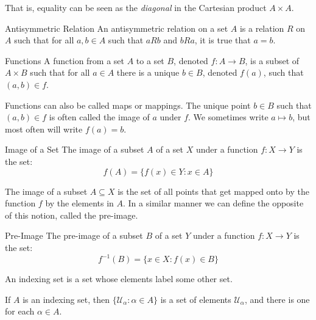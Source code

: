 \documentclass[crop=false,class=book,oneside]{standalone}
\begin{document}
        That is, equality can be seen as the \textit{diagonal} in the
        Cartesian product $A\times{A}$.
        \begin{ldefinition}{Antisymmetric Relation}
            An antisymmetric relation on a set $A$ is a relation $R$ on $A$
            such that for all $a,b\in{A}$ such that $aRb$ and $bRa$, it
            is true that $a=b$.
        \end{ldefinition}
        \begin{ldefinition}{Functions}
            A function from a set $A$ to a set $B$, denoted
            $f:A\rightarrow B$, is a subset of $A\times{B}$
            such that for all $a\in{A}$ there is a unique
            $b\in{B}$, denoted $f(a)$, such that $(a,b)\in{f}$.
        \end{ldefinition}
        Functions can also be called maps or mappings. The unique point
        $b\in{B}$ such that $(a,b)\in{f}$ is often called the image of
        $a$ under $f$. We sometimes write $a\mapsto{b}$, but most often
        will write $f(a)=b$.
        \begin{ldefinition}{Image of a Set}
            The image of a subset $A$ of a set $X$ under a function
            $f:X\rightarrow{Y}$ is the set:
            \begin{equation}
                f(A)=\{f(x)\in{Y}:x\in{A}\}
            \end{equation}
        \end{ldefinition}
        The image of a subset $A\subseteq{X}$ is the set of all points
        that get mapped onto by the function $f$ by the elements in $A$.
        In a similar manner we can define the opposite of this notion,
        called the pre-image.
        \begin{ldefinition}{Pre-Image}
            The pre-image of a subset $B$ of a set $Y$ under a function
            $f:X\rightarrow{Y}$ is the set:
            \begin{equation}
                f^{-1}(B)=\{x\in{X}:f(x)\in{B}\}
            \end{equation}
        \end{ldefinition}
        \begin{definition}
        An indexing set is a set whose elements label some other set.
        \end{definition}
        \begin{example}
        If $A$ is an indexing set, then $\{\mathcal{U}_{\alpha}:\alpha \in A\}$ is a set of elements $\mathcal{U}_{\alpha}$, and there is one for each $\alpha \in A$.
        \end{example}
\end{document}
